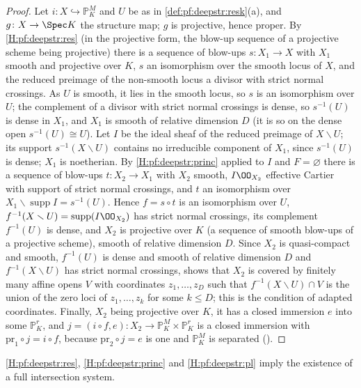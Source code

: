 \begin{proof}
Let $i\colon X\hookrightarrow\mathbb P^M_K$ and $U$ be as in \cref{def:pf:deepstr:resk}(a), and $g\colon X\to\Spec K$
the structure map; $g$ is projective, hence proper. By \ref{H:pf:deepstr:res} (in the projective form, the blow-up
sequence of a projective scheme being projective) there is a sequence of blow-ups $s\colon X_1\to X$ with $X_1$
smooth and projective over $K$, $s$ an isomorphism over the smooth locus of $X$, and the reduced preimage of
the non-smooth locus a divisor with strict normal crossings. As $U$ is smooth, it lies in the smooth locus,
so $s$ is an isomorphism over $U$; the complement of a divisor with strict normal crossings is dense, so
$s^{-1}(U)$ is dense in $X_1$, and $X_1$ is smooth of relative dimension $D$ (it is so on the dense open
$s^{-1}(U)\cong U$). Let $I$ be the ideal sheaf of the reduced preimage of $X\smallsetminus U$; its support
$s^{-1}(X\smallsetminus U)$ contains no irreducible component of $X_1$, since $s^{-1}(U)$ is dense; $X_1$ is
noetherian. By \ref{H:pf:deepstr:princ} applied to $I$ and $F=\varnothing$ there is a sequence of blow-ups
$t\colon X_2\to X_1$ with $X_2$ smooth, $I\OO_{X_2}$ effective Cartier with support of strict normal
crossings, and $t$ an isomorphism over $X_1\smallsetminus\operatorname{supp}I=s^{-1}(U)$. Hence $f=s\circ t$ is an
isomorphism over $U$, $f^{-1}(X\smallsetminus U)=\operatorname{supp}(I\OO_{X_2})$ has strict normal crossings, its
complement $f^{-1}(U)$ is dense, and $X_2$ is projective over $K$ (a sequence of smooth blow-ups of a projective
scheme), smooth of relative dimension $D$. Since $X_2$ is quasi-compact and smooth, $f^{-1}(U)$ is dense and
smooth of relative dimension $D$ and $f^{-1}(X\smallsetminus U)$ has strict normal crossings,
 shows that $X_2$ is covered by finitely many affine opens $V$ with
coordinates $z_1,\dots,z_D$ such that $f^{-1}(X\smallsetminus U)\cap V$ is the union of the zero loci of
$z_1,\dots,z_k$ for some $k\le D$; this is the condition of adapted coordinates. Finally, $X_2$ being
projective over $K$, it has a closed immersion $e$ into some $\mathbb P^r_K$, and $j=(i\circ f,e)\colon
X_2\to\mathbb P^M_K\times\mathbb P^r_K$ is a closed immersion with $\mathrm{pr}_1\circ j=i\circ f$, because
$\mathrm{pr}_2\circ j=e$ is one and $\mathbb P^M_K$ is separated
().
\end{proof}

\begin{lemma}\label{lem:pf:deepstr:ais}
\ref{H:pf:deepstr:res}, \ref{H:pf:deepstr:princ} and \ref{H:pf:deepstr:pl} imply the existence of a full
intersection system. 
\end{lemma}

